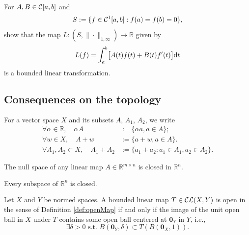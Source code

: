 \begin{exc}
  For $A,B\in {\cal C}[a,b]$ and
  \begin{equation}
    \label{eq:C10}
    S := \{f\in {\cal C}^1[a,b]: f(a)=f(b)=0\}, 
  \end{equation}
  show that the map 
  $L: (S, \|\cdot\|_{1,\infty}) \rightarrow \mathbb{R}$
  given by
  \begin{displaymath}
    L(f) = \int_a^b \bigl[A(t)f(t)+B(t)f'(t)\bigr] \mathrm{d} t
  \end{displaymath}
  is a bounded linear transformation.
\end{exc}

\subsection{Consequences on the topology}

\begin{ntn}
  \label{ntn:setLinearOpNotation}
  For a vector space $X$ and 
  its subsets $A$, $A_1$, $A_2$, 
  we write
    \begin{equation}
    \label{eq:setLinearOpNotation}
      \begin{array}{rl}
        \forall \alpha\in \mathbb{R},
        \quad \alpha A &:= \{\alpha a, a\in A\};
        \\
        \forall w\in X,\quad 
        A + w &:= \{a+w, a\in A\}.
        \\
        \forall A_1, A_2 \subset X,\quad 
        A_1 + A_2 &:= \{a_1+a_2: a_1\in A_1, a_2\in A_2\}.
      \end{array}
  \end{equation}
\end{ntn}

\begin{lem}
  \label{lem:KernelIsClosed}
  The null space of any linear map $A\in \mathbb{R}^{m\times n}$
  is closed in $\mathbb{R}^n$.
\end{lem}

\begin{thm}
  \label{thm:finiteDimSubspaceIsClosed}
  Every subspace of $\mathbb{R}^n$ is closed.
\end{thm}

\begin{lem}
  \label{lem:openMapCharInNormedSpaces}
  Let $X$ and $Y$ be normed spaces.
  A bounded linear map $T\in {\cal CL}(X,Y)$ is open
  in the sense of Definition \ref{def:openMap}
  if and only if the image of the unit open ball in $X$ under $T$
  contains some open ball centered at $\mathbf{0}_Y$ in $Y$, i.e.,
  \begin{equation}
    \label{eq:openMapCharInNormedSpaces}
    \exists \delta>0 \text{ s.t. }
    B(\mathbf{0}_Y, \delta) \subset T\left({B(\mathbf{0}_X,1)}\right).
  \end{equation}
\end{lem}

